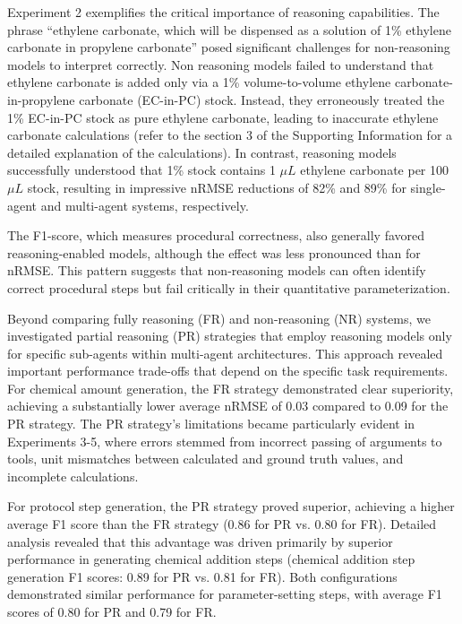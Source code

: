 \documentclass[sn-nature, twocolumn]{sn-jnl}%
\theoremstyle{thmstyleone}%
\theoremstyle{thmstyletwo}%
\theoremstyle{thmstylethree}%
\begin{document}
Experiment 2 exemplifies the critical importance of reasoning capabilities. The phrase ``ethylene carbonate, which will be dispensed as a solution of 1\% ethylene carbonate in propylene carbonate'' posed significant challenges for non-reasoning models to interpret correctly. Non reasoning models failed to understand that ethylene carbonate is added only via a 1\% volume-to-volume ethylene carbonate-in-propylene carbonate (EC-in-PC) stock. Instead, they erroneously treated the 1\% EC-in-PC stock as pure ethylene carbonate, leading to inaccurate ethylene carbonate calculations (refer to the section 3 of the Supporting Information for a detailed explanation of the calculations). In contrast, reasoning models successfully understood that 1\% stock contains 1 $\mu L$ ethylene carbonate per 100 $\mu L$ stock, resulting in impressive nRMSE reductions of 82\% and 89\% for single-agent and multi-agent systems, respectively.


The F1-score, which measures procedural correctness, also generally favored reasoning-enabled models, although the effect was less pronounced than for nRMSE. This pattern suggests that non-reasoning models can often identify correct procedural steps but fail critically in their quantitative parameterization. 


Beyond comparing fully reasoning (FR) and non-reasoning (NR) systems, we investigated partial reasoning (PR) strategies that employ reasoning models only for specific sub-agents within multi-agent architectures. This approach revealed important performance trade-offs that depend on the specific task requirements. For chemical amount generation, the FR strategy demonstrated clear superiority, achieving a substantially lower average nRMSE of 0.03 compared to 0.09 for the PR strategy. The PR strategy's limitations became particularly evident in Experiments 3-5, where errors stemmed from incorrect passing of arguments to tools, unit mismatches between calculated and ground truth values, and incomplete calculations. 

For protocol step generation, the PR strategy proved superior, achieving a higher average F1 score than the FR strategy (0.86 for PR vs. 0.80 for FR). Detailed analysis revealed that this advantage was driven primarily by superior performance in generating chemical addition steps (chemical addition step generation F1 scores: 0.89 for PR vs. 0.81 for FR). Both configurations demonstrated similar performance for parameter-setting steps, with average F1 scores of 0.80 for PR and 0.79 for FR. 
\end{document}
